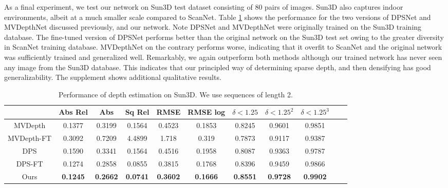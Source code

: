 \documentclass[runningheads]{llncs}
\begin{document}
As a final experiment, we test our network on Sun3D test dataset consisting of 80 pairs of images. Sun3D also captures indoor environments, albeit at a much smaller scale compared to ScanNet. Table \ref{sun3d} shows the performance for the two versions of DPSNet and MVDepthNet discussed previously, and our network. Note DPSNet and MVDepthNet were originally trained on the Sun3D training database. The fine-tuned version of DPSNet performs better than the original network on the Sun3D test set owing to the greater diversity in ScanNet training database. MVDepthNet on the contrary performs worse, indicating that it overfit to ScanNet and the original network was sufficiently trained and generalized well. Remarkably, we again outperform both methods although our trained network has never seen any image from the Sun3D database. This indicates that our principled way of determining sparse depth, and then densifying has good generalizability. The supplement shows additional qualitative results. 
\begin{table}[t]
  \caption{Performance of depth estimation on Sun3D. We use sequences of length 2.}
  \centering
\begin{tabular}{ccccccccccc}
    \hline
     &Abs Rel  &Abs & Sq Rel & RMSE & RMSE log & \textbf{$\delta< 1.25$}& \textbf{$\delta < 1.25^2$}& \textbf{$\delta< 1.25^3$}\\
    \hline
    MVDepth & 0.1377  &  0.3199 & 0.1564 & 0.4523 & 0.1853 & 0.8245 & 0.9601 & 0.9851  \\
    MVDepth-FT & 0.3092 & 0.7209 & 4.4899 & 1.718 & 0.319 & 0.7873 & 0.9117 & 0.9387  \\
    DPS & 0.1590 & 0.3341 & 0.1564 & 0.4516 & 0.1958& 0.8087 & 0.9363 & 0.9787		 \\
    DPS-FT &	0.1274 & 0.2858 & 0.0855 & 0.3815 & 0.1768 & 0.8396 & 0.9459 & 0.9866	\\
    Ours &	\textbf{0.1245} & \textbf{0.2662} & \textbf{0.0741}  & \textbf{0.3602} & \textbf{0.1666}& \textbf{0.8551} & \textbf{0.9728} & \textbf{0.9902} \\
    \hline
  \end{tabular}
  \label{sun3d}
\end{table}
\end{document}
